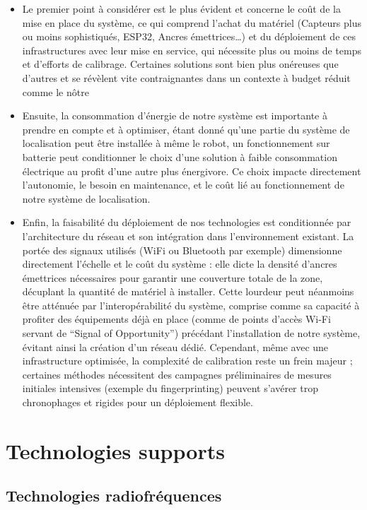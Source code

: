 \documentclass[11pt, a4paper]{article}
\begin{document}
\begin{itemize}
	\item Le premier point à considérer est le plus évident et concerne le coût de la mise en place du système, ce qui comprend l’achat du matériel (Capteurs plus ou moins sophistiqués, ESP32, Ancres émettrices…) et du déploiement de ces infrastructures avec leur mise en service, qui nécessite plus ou moins de temps et d’efforts de calibrage. Certaines solutions sont bien plus onéreuses que d’autres et se révèlent vite contraignantes dans un contexte à budget réduit comme le nôtre
	\item Ensuite, la consommation d'énergie de notre système est importante à prendre en compte et à optimiser, étant donné qu’une partie du système de localisation peut être installée à même le robot, un fonctionnement sur batterie peut conditionner le choix d’une solution à faible consommation électrique au profit d’une autre plus énergivore. Ce choix impacte directement l’autonomie, le besoin en maintenance, et le coût lié au fonctionnement de notre système de localisation. 
	\item Enfin, la faisabilité du déploiement de nos technologies est conditionnée par l'architecture du réseau et son intégration dans l'environnement existant. La portée des signaux utilisés (WiFi ou Bluetooth par exemple) dimensionne directement l’échelle et le coût du système  : elle dicte la densité d'ancres émettrices nécessaires pour garantir une couverture totale de la zone, décuplant la quantité de matériel à installer. Cette lourdeur peut néanmoins être atténuée par l'interopérabilité du système, comprise comme sa capacité à profiter des équipements déjà en place (comme de points d'accès Wi-Fi servant de “Signal of Opportunity”) précédant l’installation de notre système, évitant ainsi la création d'un réseau dédié. Cependant, même avec une infrastructure optimisée, la complexité de calibration reste un frein majeur ; certaines méthodes nécessitent des campagnes préliminaires de mesures initiales intensives (exemple du fingerprinting) peuvent s'avérer trop chronophages et rigides pour un déploiement flexible. 
\end{itemize}

\section{Technologies supports}
\subsection{Technologies radiofréquences}
\end{document}
